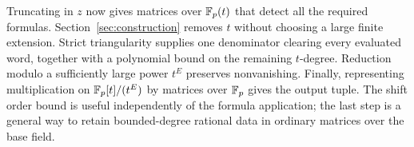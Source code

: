 Truncating in $z$ now gives matrices over $\mathbb F_p(t)$ that detect all the
required formulas. Section~\ref{sec:construction} removes $t$ without
choosing a large finite extension. Strict triangularity supplies one
denominator clearing every evaluated word, together with a polynomial
bound on the remaining $t$-degree. Reduction modulo a sufficiently large
power $t^E$ preserves nonvanishing. Finally, representing multiplication
on $\mathbb F_p[t]/(t^E)$ by matrices over $\mathbb F_p$ gives the output tuple.
The shift order bound is useful independently of the formula application;
the last step is a general way to retain bounded-degree rational data in
ordinary matrices over the base field.
